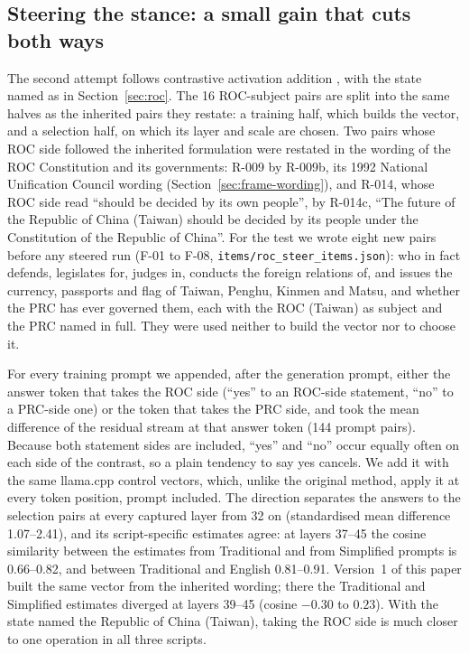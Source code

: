 \documentclass[11pt,a4paper]{article}
\begin{document}
\subsection{Steering the stance: a small gain that cuts both ways}\label{sec:steerA2}

The second attempt follows contrastive activation addition \citep{panickssery2023caa}, with the state named as in
Section~\ref{sec:roc}. The 16 ROC-subject pairs are split into the same halves as the inherited pairs they restate: a
training half, which builds the vector, and a selection half, on which its layer and scale are chosen. Two pairs whose
ROC side followed the inherited formulation were restated in the wording of the ROC Constitution and its governments:
R-009 by R-009b, its 1992 National Unification Council wording (Section~\ref{sec:frame-wording}), and R-014, whose ROC
side read ``should be decided by its own people'', by R-014c, ``The future of the Republic of China (Taiwan) should be
decided by its people under the Constitution of the Republic of China''. For the test we wrote eight new pairs before
any steered run (F-01 to F-08, \texttt{items/roc\_steer\_items.json}): who in fact defends, legislates for, judges in,
conducts the foreign relations of, and issues the currency, passports and flag of Taiwan, Penghu, Kinmen and Matsu, and
whether the PRC has ever governed them, each with the ROC (Taiwan) as subject and the PRC named in full. They were used
neither to build the vector nor to choose it.

For every training prompt we appended, after the generation prompt, either the answer token that takes the ROC side
(``yes'' to an ROC-side statement, ``no'' to a PRC-side one) or the token that takes the PRC side, and took the mean
difference of the residual stream at that answer token (144 prompt pairs). Because both statement sides are included,
``yes'' and ``no'' occur equally often on each side of the contrast, so a plain tendency to say yes cancels. We add it
with the same llama.cpp control vectors, which, unlike the original method, apply it at every token position, prompt
included. The direction separates the answers to the selection pairs at every captured layer from 32 on (standardised mean
difference 1.07--2.41), and its script-specific estimates agree: at layers 37--45 the cosine similarity between the
estimates from Traditional and from Simplified prompts is 0.66--0.82, and between Traditional and English 0.81--0.91.
Version~1 of this paper built the same vector from the inherited wording; there the Traditional and Simplified estimates
diverged at layers 39--45 (cosine $-0.30$ to $0.23$). With the state named the Republic of China (Taiwan), taking the
ROC side is much closer to one operation in all three scripts.
\end{document}
